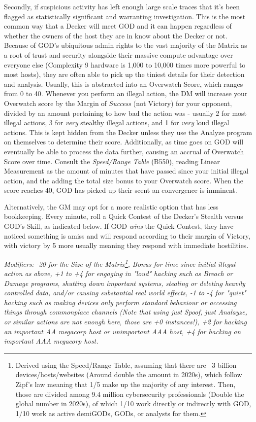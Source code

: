 \begin{multicols}{3}
	Secondly, if suspicious activity has left enough large scale traces that it's been flagged as statistically significant and warranting investigation. This is the most common way that a Decker will meet GOD and it can happen regardless of whether the owners of the host they are in know about the Decker or not. Because of GOD's ubiquitous admin rights to the vast majority of the Matrix as a root of trust and security alongside their massive compute advantage over everyone else (Complexity 9 hardware is 1,000 to 10,000 times more powerful to most hosts), they are often able to pick up the tiniest details for their detection and analysis. Usually, this is abstracted into an Overwatch Score, which ranges from 0 to 40. Whenever you perform an illegal action, the DM will increase your Overwatch score by the Margin of \textit{Success} (not Victory) for your opponent, divided by an amount pertaining to how bad the action was - usually 2 for most illegal actions, 3 for \textit{very} stealthy illegal actions, and 1 for \textit{very} loud illegal actions. This is kept hidden from the Decker unless they use the Analyze program on themselves to determine their score. Additionally, as time goes on GOD will eventually be able to process the data further, causing an accrual of Overwatch Score over time. Consult the \textit{Speed/Range Table} (B550), reading Linear Measurement as the amount of minutes that have passed since your initial illegal action, and the adding the total size bonus to your Overwatch score. When the score reaches 40, GOD has picked up their scent an convergence is imminent.
	
	Alternatively, the GM may opt for a more realistic option that has less bookkeeping. Every minute, roll a Quick Contest of the Decker's Stealth versus GOD's Skill, as indicated below. If GOD \textit{wins} the Quick Contest, they have noticed something is amiss and will respond according to their margin of Victory, with victory by 5 more usually meaning they respond with immediate hostilities.
	
	\textcolor{NavyBlue}{\textit{Modifiers: -20 for the Size of the Matrix\footnote{Derived using the Speed/Range Table, assuming that there are ~3 billion devices/hosts/websites (Around double the amount in 2020s), which follow Zipf's law meaning that 1/5 make up the majority of any interest. Then, those are divided among 9.4 million cybersecurity professionals (Double the global number in 2020s), of which 1/10 work directly or indirectly with GOD, 1/10 work as active demiGODs, GODs, or analysts for them.}, Bonus for time since initial illegal action as above, +1 to +4 for engaging in "loud" hacking such as Breach or Damage programs, shutting down important systems, stealing or deleting heavily controlled data, and/or causing substantial real world effects, -1 to -4 for "quiet" hacking such as making devices only perform standard behaviour or accessing things through commonplace channels (Note that using just Spoof, just Analayze, or similar actions are not enough here, those are +0 instances!), +2 for hacking an important AA megacorp host or unimportant AAA host, +4 for hacking an important AAA megacorp host.}}
	

\end{multicols}
